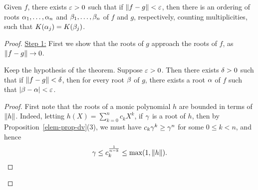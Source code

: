 \begin{thm}
Given $f$, there exists $\varepsilon>0$ such that if $\left\Vert {f-g}\right\Vert<\varepsilon$, then there is an ordering of roots $\alpha_1,\ldots, \alpha_n$ and $\beta_1,\ldots, \beta_n$ of $f$ and $g$, respectively, counting multiplicities, such that $K(\alpha_j)=K(\beta_j)$.
\end{thm}
\begin{proof}
\noindent\underline{Step 1:} First we show that the roots of $g$ approach the roots of $f$, as $\left\Vert {f-g}\right\Vert\to 0$.
\begin{lem}
Keep the hypothesis of the theorem. Suppose $\varepsilon>0$. Then there exists $\delta>0$ such that if $\left\Vert {f-g}\right\Vert<\delta$, then for every root $\beta$ of $g$, there exists a root $\alpha$ of $f$ such that $|\beta-\alpha|<\varepsilon$.
\end{lem}
\begin{proof}
First note that the roots of a monic polynomial $h$ are bounded in terms of $\left\Vert {h}\right\Vert$. Indeed, letting $h(X)=\sum_{k=0}^n c_kX^k$, if $\gamma$ is a root of $h$, then by Proposition~\ref{elem-prop-dv}(3), we must have $c_k\gamma^k \ge \gamma^n$ for some $0\le k<n$, and hence
\[
\gamma\le c_k^{\frac{1}{n-k}}\le \max(1,\left\Vert {h}\right\Vert).
\]


\end{proof}
\end{proof}
